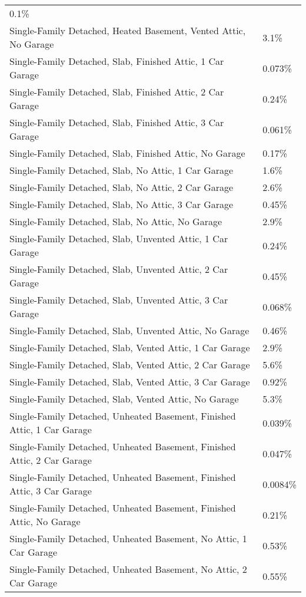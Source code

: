 \begin{longtable}[]{@{}ll@{}}
0.1\% \\
Single-Family Detached, Heated Basement, Vented Attic, No Garage &
3.1\% \\
Single-Family Detached, Slab, Finished Attic, 1 Car Garage & 0.073\% \\
Single-Family Detached, Slab, Finished Attic, 2 Car Garage & 0.24\% \\
Single-Family Detached, Slab, Finished Attic, 3 Car Garage & 0.061\% \\
Single-Family Detached, Slab, Finished Attic, No Garage & 0.17\% \\
Single-Family Detached, Slab, No Attic, 1 Car Garage & 1.6\% \\
Single-Family Detached, Slab, No Attic, 2 Car Garage & 2.6\% \\
Single-Family Detached, Slab, No Attic, 3 Car Garage & 0.45\% \\
Single-Family Detached, Slab, No Attic, No Garage & 2.9\% \\
Single-Family Detached, Slab, Unvented Attic, 1 Car Garage & 0.24\% \\
Single-Family Detached, Slab, Unvented Attic, 2 Car Garage & 0.45\% \\
Single-Family Detached, Slab, Unvented Attic, 3 Car Garage & 0.068\% \\
Single-Family Detached, Slab, Unvented Attic, No Garage & 0.46\% \\
Single-Family Detached, Slab, Vented Attic, 1 Car Garage & 2.9\% \\
Single-Family Detached, Slab, Vented Attic, 2 Car Garage & 5.6\% \\
Single-Family Detached, Slab, Vented Attic, 3 Car Garage & 0.92\% \\
Single-Family Detached, Slab, Vented Attic, No Garage & 5.3\% \\
Single-Family Detached, Unheated Basement, Finished Attic, 1 Car Garage
& 0.039\% \\
Single-Family Detached, Unheated Basement, Finished Attic, 2 Car Garage
& 0.047\% \\
Single-Family Detached, Unheated Basement, Finished Attic, 3 Car Garage
& 0.0084\% \\
Single-Family Detached, Unheated Basement, Finished Attic, No Garage &
0.21\% \\
Single-Family Detached, Unheated Basement, No Attic, 1 Car Garage &
0.53\% \\
Single-Family Detached, Unheated Basement, No Attic, 2 Car Garage &
0.55\% \\

\end{longtable}
